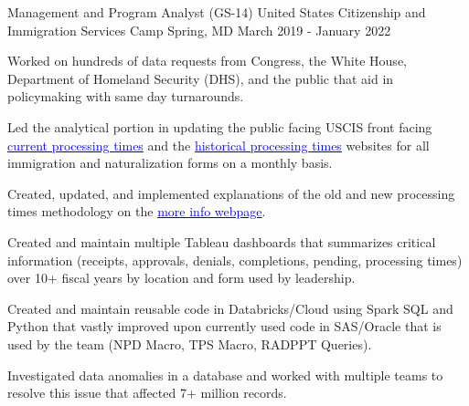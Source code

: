 \begin{cventries}
\cventry
{Management and Program Analyst (GS-14)} %
{United States Citizenship and Immigration Services} %
{Camp Spring, MD} %
{March 2019 - January 2022} %
{ %
\begin{cvitems}
\item {Worked on hundreds of data requests from Congress, the White House, Department of Homeland Security (DHS), and the public that aid in policymaking with same day turnarounds.}
\item {Led the analytical portion in updating the public facing USCIS front facing \href{https://egov.uscis.gov/processing-times/}{\textcolor{blue}{current processing times}} and the \href{https://egov.uscis.gov/processing-times/historic-pt}{\textcolor{blue}{historical processing times}} websites for all immigration and naturalization forms on a monthly basis.}
\item {Created, updated, and implemented explanations of the old and new processing times methodology on the \href{https://egov.uscis.gov/processing-times/more-info}{\textcolor{blue}{more info webpage}}.}
\item {Created and maintain multiple Tableau dashboards that summarizes critical information (receipts, approvals, denials, completions, pending, processing times) over 10+ fiscal years by location and form used by leadership.}
\item {Created and maintain reusable code in Databricks/Cloud using Spark SQL and Python that vastly improved upon currently used code in SAS/Oracle that is used by the team (NPD Macro, TPS Macro, RADPPT Queries).}
\item {Investigated data anomalies in a database and worked with multiple teams to resolve this issue that affected 7+ million records.}
\end{cvitems}
}


\end{cventries}
